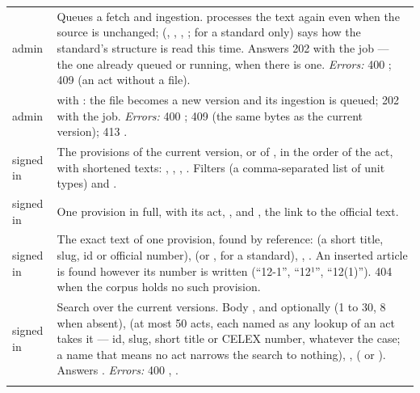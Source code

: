 \begin{xltabular}{\textwidth}{@{}L{19mm}Y@{}}
\addlinespace
{}
admin & Queues a fetch and ingestion.  processes the text again even when the
  source is unchanged;  (, , , ;
  for a standard only) says how the standard's structure is read this time. Answers 202 with
  the job --- the one already queued or running, when there is one. \emph{Errors:} 400
  ; 409  (an  act without a file). \\
\addlinespace
{}
admin &  with : the file becomes a new version and its
  ingestion is queued; 202 with the job. \emph{Errors:} 400 ; 409
   (the same bytes as the current version); 413 . \\
\addlinespace
{}
signed in & The provisions of the current version, or of , in the order of the
  act, with shortened texts: , , , . Filters
   (a comma-separated list of unit types) and . \\
\addlinespace
{}
signed in & One provision in full, with its act, ,  and
  , the link to the official text. \\
\addlinespace
{}
signed in & The exact text of one provision, found by reference:  (a short
  title, slug, id or official number),  (or , for a standard),
  , . An inserted article is found however its number is written
  (\enquote{12-1}, \enquote{12¹}, \enquote{12(1)}). 404 when the corpus holds no such
  provision. \\
\addlinespace
{}
signed in & Search over the current versions. Body , and optionally  (1 to
  30, 8 when absent),  (at most 50 acts, each named as any lookup of an act
  takes it --- id, slug, short title or CELEX number, whatever the case; a name that means no
  act narrows the search to nothing), ,  ( or
  ). Answers .
  \emph{Errors:} 400 , . \\
\addlinespace
{}

\end{xltabular}
